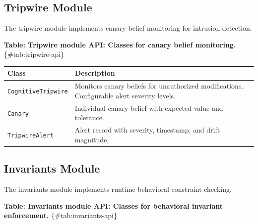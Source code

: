 \documentclass[
]{article}
\newcounter{none} %
\begin{document}
\subsection{Tripwire Module}\label{sec:tripwire-api}

The tripwire module implements canary belief monitoring for intrusion
detection.

\textbf{Table: Tripwire module API: Classes for canary belief
monitoring.} \{\#tab:tripwire-api\}

{\def\LTcaptype{none} %
\begin{longtable}[]{@{}
  >{\raggedright\arraybackslash}p{}
  >{\raggedright\arraybackslash}p{}@{}}
\toprule\noalign{}
\begin{minipage}[b]{\linewidth}\raggedright
Class
\end{minipage} & \begin{minipage}[b]{\linewidth}\raggedright
Description
\end{minipage} \\
\midrule\noalign{}
\endhead
\bottomrule\noalign{}
\endlastfoot
\texttt{CognitiveTripwire} & Monitors canary beliefs for unauthorized
modifications. Configurable alert severity levels. \\
\texttt{Canary} & Individual canary belief with expected value and
tolerance. \\
\texttt{TripwireAlert} & Alert record with severity, timestamp, and
drift magnitude. \\
\end{longtable}
}

\subsection{Invariants Module}\label{sec:invariants-api}

The invariants module implements runtime behavioral constraint checking.

\textbf{Table: Invariants module API: Classes for behavioral invariant
enforcement.} \{\#tab:invariants-api\}
\end{document}
